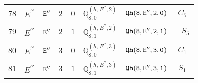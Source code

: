 \documentclass[fleqn,8pt]{jsarticle}
\begin{document}
\begin{table}[ht!]
\begin{center}
\begin{tabular}{cccccccc}
$ 78 $ & $ E^{\prime\prime} $ & $ {\tt E''} $ & $ 2 $ & $ 0 $ & $ \mathbb{Q}_{8,0}^{(h,E^{\prime\prime},2)} $ & $ {\tt Qh(8,E'',2,0)} $ & $ C_{5} $ \\
$ 79 $ & $ E^{\prime\prime} $ & $ {\tt E''} $ & $ 2 $ & $ 1 $ & $ \mathbb{Q}_{8,1}^{(h,E^{\prime\prime},2)} $ & $ {\tt Qh(8,E'',2,1)} $ & $ - S_{5} $ \\
$ 80 $ & $ E^{\prime\prime} $ & $ {\tt E''} $ & $ 3 $ & $ 0 $ & $ \mathbb{Q}_{8,0}^{(h,E^{\prime\prime},3)} $ & $ {\tt Qh(8,E'',3,0)} $ & $ C_{1} $ \\
$ 81 $ & $ E^{\prime\prime} $ & $ {\tt E''} $ & $ 3 $ & $ 1 $ & $ \mathbb{Q}_{8,1}^{(h,E^{\prime\prime},3)} $ & $ {\tt Qh(8,E'',3,1)} $ & $ S_{1} $ \\
 \hline \hline
\end{tabular}
\end{center}
\end{table}
\end{document}
